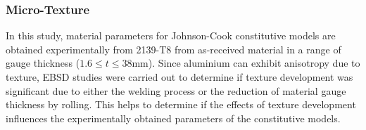	\subsubsection{Micro-Texture}
	\label{RADMicrostructureTexture}
	In this study, material parameters for Johnson-Cook constitutive models are obtained experimentally from 2139-T8 from as-received material in a range of gauge thickness ($1.6 \leq t \leq 38 \text{mm}$). Since aluminium can exhibit anisotropy due to texture, EBSD studies were carried out to determine if texture development was significant due to either the welding process or the reduction of material gauge thickness by rolling. This helps to determine if the effects of texture development influences the experimentally obtained parameters of the constitutive models.
	\begin{figure}[h!t]
		 \hfill
		\hfill
		\hfill

\end{figure}
